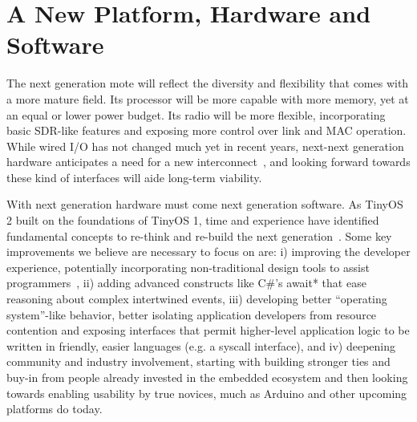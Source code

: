 \section{A New Platform, Hardware and Software}

The next generation mote will reflect the diversity and flexibility that comes
with a more mature field. Its processor will be more capable with more memory,
yet at an equal or lower power budget. Its radio will be more flexible,
incorporating basic SDR-like features and exposing more control over link and
MAC operation. While wired I/O has not changed much yet in recent years,
next-next generation hardware anticipates a need for a new
interconnect~\cite{m3}, and looking forward towards these kind of interfaces
will aide long-term viability.

With next generation hardware must come next generation software. As TinyOS 2
built on the foundations of TinyOS 1, time and experience have identified
fundamental concepts to re-think and re-build the next
generation~\cite{tinyos-retrospective}. Some key improvements we believe are
necessary to focus on are: i) improving the developer experience, potentially
incorporating non-traditional design tools to assist
programmers~\cite{brown-bubbles}, ii) adding advanced constructs like C\#'s
await* that ease reasoning about complex intertwined events, iii) developing
better “operating system”-like behavior, better isolating application
developers from resource contention and exposing interfaces that permit
higher-level application logic to be written in friendly, easier languages
(e.g. a syscall interface), and iv) deepening community and industry
involvement, starting with building stronger ties and buy-in from people
already invested in the embedded ecosystem and then looking towards enabling
usability by true novices, much as Arduino and other upcoming platforms do
today.

% 
% 
% 
% 
% 

